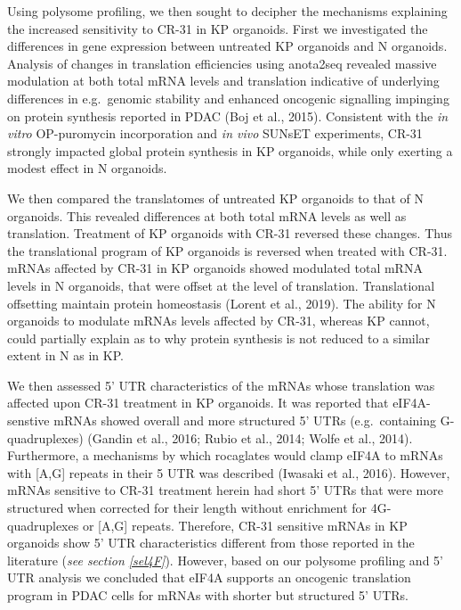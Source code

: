 \documentclass[12pt,openany]{book}
\begin{document}
Using polysome profiling, we then sought to decipher the mechanisms
explaining the increased sensitivity to CR-31 in KP organoids. First we
investigated the differences in gene expression between untreated KP
organoids and N organoids. Analysis of changes in translation
efficiencies using anota2seq revealed massive modulation at both total
mRNA levels and translation indicative of underlying differences in
e.g.~genomic stability and enhanced oncogenic signalling impinging on
protein synthesis reported in PDAC (Boj et al., 2015). Consistent with
the \emph{in vitro} OP-puromycin incorporation and \emph{in vivo} SUNsET
experiments, CR-31 strongly impacted global protein synthesis in KP
organoids, while only exerting a modest effect in N organoids.

We then compared the translatomes of untreated KP organoids to that of N
organoids. This revealed differences at both total mRNA levels as well
as translation. Treatment of KP organoids with CR-31 reversed these
changes. Thus the translational program of KP organoids is reversed when
treated with CR-31. mRNAs affected by CR-31 in KP organoids showed
modulated total mRNA levels in N organoids, that were offset at the
level of translation. Translational offsetting maintain protein
homeostasis (Lorent et al., 2019). The ability for N organoids to
modulate mRNAs levels affected by CR-31, whereas KP cannot, could
partially explain as to why protein synthesis is not reduced to a
similar extent in N as in KP.

We then assessed 5' UTR characteristics of the mRNAs whose translation
was affected upon CR-31 treatment in KP organoids. It was reported that
eIF4A-senstive mRNAs showed overall and more structured 5' UTRs
(e.g.~containing G-quadruplexes) (Gandin et al., 2016; Rubio et al.,
2014; Wolfe et al., 2014). Furthermore, a mechanisms by which rocaglates
would clamp eIF4A to mRNAs with {[}A,G{]} repeats in their 5 UTR was
described (Iwasaki et al., 2016). However, mRNAs sensitive to CR-31
treatment herein had short 5' UTRs that were more structured when
corrected for their length without enrichment for 4G-quadruplexes or
{[}A,G{]} repeats. Therefore, CR-31 sensitive mRNAs in KP organoids show
5' UTR characteristics different from those reported in the literature
(\emph{see section \ref{sel4F}}). However, based on our polysome
profiling and 5' UTR analysis we concluded that eIF4A supports an
oncogenic translation program in PDAC cells for mRNAs with shorter but
structured 5' UTRs.
\end{document}
